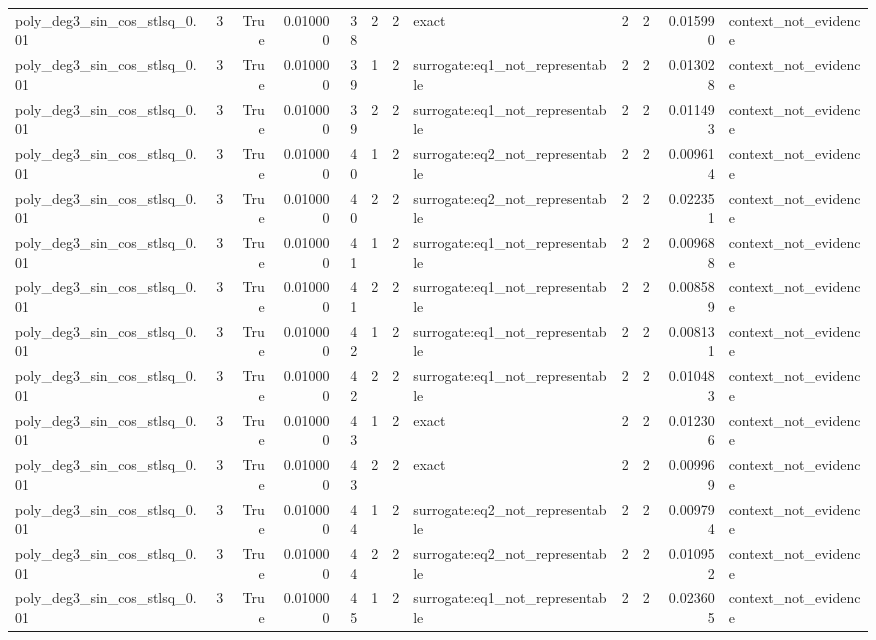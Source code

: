 \begin{tabular}{lrrrrrrlrrrl}
poly\_deg3\_sin\_cos\_stlsq\_0.01 & 3 & True & 0.010000 & 38 & 2 & 2 & exact & 2 & 2 & 0.015990 & context\_not\_evidence \\
poly\_deg3\_sin\_cos\_stlsq\_0.01 & 3 & True & 0.010000 & 39 & 1 & 2 & surrogate:eq1\_not\_representable & 2 & 2 & 0.013028 & context\_not\_evidence \\
poly\_deg3\_sin\_cos\_stlsq\_0.01 & 3 & True & 0.010000 & 39 & 2 & 2 & surrogate:eq1\_not\_representable & 2 & 2 & 0.011493 & context\_not\_evidence \\
poly\_deg3\_sin\_cos\_stlsq\_0.01 & 3 & True & 0.010000 & 40 & 1 & 2 & surrogate:eq2\_not\_representable & 2 & 2 & 0.009614 & context\_not\_evidence \\
poly\_deg3\_sin\_cos\_stlsq\_0.01 & 3 & True & 0.010000 & 40 & 2 & 2 & surrogate:eq2\_not\_representable & 2 & 2 & 0.022351 & context\_not\_evidence \\
poly\_deg3\_sin\_cos\_stlsq\_0.01 & 3 & True & 0.010000 & 41 & 1 & 2 & surrogate:eq1\_not\_representable & 2 & 2 & 0.009688 & context\_not\_evidence \\
poly\_deg3\_sin\_cos\_stlsq\_0.01 & 3 & True & 0.010000 & 41 & 2 & 2 & surrogate:eq1\_not\_representable & 2 & 2 & 0.008589 & context\_not\_evidence \\
poly\_deg3\_sin\_cos\_stlsq\_0.01 & 3 & True & 0.010000 & 42 & 1 & 2 & surrogate:eq1\_not\_representable & 2 & 2 & 0.008131 & context\_not\_evidence \\
poly\_deg3\_sin\_cos\_stlsq\_0.01 & 3 & True & 0.010000 & 42 & 2 & 2 & surrogate:eq1\_not\_representable & 2 & 2 & 0.010483 & context\_not\_evidence \\
poly\_deg3\_sin\_cos\_stlsq\_0.01 & 3 & True & 0.010000 & 43 & 1 & 2 & exact & 2 & 2 & 0.012306 & context\_not\_evidence \\
poly\_deg3\_sin\_cos\_stlsq\_0.01 & 3 & True & 0.010000 & 43 & 2 & 2 & exact & 2 & 2 & 0.009969 & context\_not\_evidence \\
poly\_deg3\_sin\_cos\_stlsq\_0.01 & 3 & True & 0.010000 & 44 & 1 & 2 & surrogate:eq2\_not\_representable & 2 & 2 & 0.009794 & context\_not\_evidence \\
poly\_deg3\_sin\_cos\_stlsq\_0.01 & 3 & True & 0.010000 & 44 & 2 & 2 & surrogate:eq2\_not\_representable & 2 & 2 & 0.010952 & context\_not\_evidence \\
poly\_deg3\_sin\_cos\_stlsq\_0.01 & 3 & True & 0.010000 & 45 & 1 & 2 & surrogate:eq1\_not\_representable & 2 & 2 & 0.023605 & context\_not\_evidence \\

\end{tabular}
